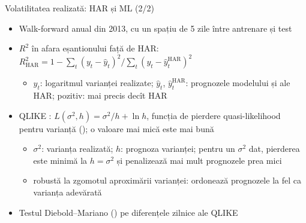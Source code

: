 \begin{frame}{Volatilitatea realizată: HAR și ML (2/2)}
\itemsize{\footnotesize}
\begin{itemize}
    \item Walk-forward anual din 2013, cu un spațiu de 5 zile între antrenare și test
    \item $R^2$ în afara eșantionului față de HAR: $R^2_{\text{HAR}} = 1 - \sum_t (y_t - \hat y_t)^2 / \sum_t (y_t - \hat y_t^{\text{HAR}})^2$
    \begin{itemize}
        \item $y_t$: logaritmul varianței realizate; $\hat y_t$, $\hat y_t^{\text{HAR}}$: prognozele modelului și ale HAR; pozitiv: mai precis decît HAR
    \end{itemize}
    \item QLIKE : $L(\sigma^2, h) = \sigma^2/h + \ln h$, funcția de pierdere quasi-likelihood pentru varianță (); o valoare mai mică este mai bună
    \begin{itemize}
        \item $\sigma^2$: varianța realizată; $h$: prognoza varianței; pentru un $\sigma^2$ dat, pierderea este minimă la $h = \sigma^2$ și penalizează mai mult prognozele prea mici
        \item robustă la zgomotul aproximării varianței: ordonează prognozele la fel ca varianța adevărată
    \end{itemize}
    \item Testul Diebold--Mariano () pe diferențele zilnice ale QLIKE
\end{itemize}
\end{frame}

